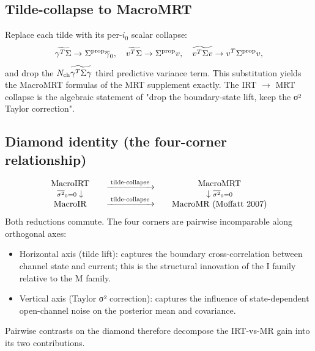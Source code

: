 \documentclass[11pt]{article}
\begin{document}
\subsection{Tilde-collapse to MacroMRT}

Replace each tilde with its per-$i_0$ scalar collapse:
\[
  \widetilde{\gamma^{T}\Sigma} \to \Sigma^{\mathrm{prop}}\overline{\gamma}_0,
  \quad
  \widetilde{v^{T}\Sigma} \to \Sigma^{\mathrm{prop}}v,
  \quad
  \widetilde{v^{T}\Sigma v} \to v^{T}\Sigma^{\mathrm{prop}}v,
\]
and drop the $N_{\mathrm{ch}}\widetilde{\gamma^{T}\Sigma\gamma}$ third predictive variance term. This
substitution yields the MacroMRT formulas of the MRT supplement
exactly. The IRT $\to$ MRT collapse is the algebraic statement of
"drop the boundary-state lift, keep the σ² Taylor correction".

\subsection{Diamond identity (the four-corner relationship)}

\[
  \begin{array}{c}
    \text{MacroIRT} \\
    {\scriptstyle \overline{\sigma^2}_0=0}\downarrow \\
    \text{MacroIR}
  \end{array}
  \quad
  \begin{array}{c}
    \xrightarrow{\;\text{tilde-collapse}\;} \\[1ex]
    \xrightarrow{\;\text{tilde-collapse}\;}
  \end{array}
  \quad
  \begin{array}{c}
    \text{MacroMRT} \\
    \downarrow{\scriptstyle \overline{\sigma^2}_0=0} \\
    \text{MacroMR (Moffatt 2007)}
  \end{array}
\]
Both reductions commute. The four corners are pairwise incomparable
along orthogonal axes:
\begin{itemize}
  \item Horizontal axis (tilde lift): captures the boundary
        cross-correlation between channel state and current; this is
        the structural innovation of the I family relative to the M
        family.
  \item Vertical axis (Taylor σ² correction): captures the influence
        of state-dependent open-channel noise on the posterior mean
        and covariance.
\end{itemize}
Pairwise contrasts on the diamond therefore decompose the IRT-vs-MR
gain into its two contributions.
\end{document}
